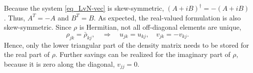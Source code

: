 \documentclass[11pt]{article}
\begin{document}
Because the system \eqref{eq_LvN-vec} is skew-symmetric, $(A + i B)^\dag = - (A + i B)$. Thus, $A^T=-A$ and $B^T =
B$. As expected, the real-valued formulation is also skew-symmetric. Since $\rho$ is
Hermitian, not all off-diagonal elements are unique,
\[
\rho_{jk} = \bar{\rho}_{kj},\quad \Rightarrow\quad u_{jk} = u_{kj},\quad v_{jk} = - v_{kj}.
\]
Hence, only the lower triangular part of the density matrix needs to be stored for the real part of
$\rho$. Further savings can be realized for the imaginary part of $\rho$, because it is zero
along the diagonal, $v_{jj}=0$.



\end{document}
